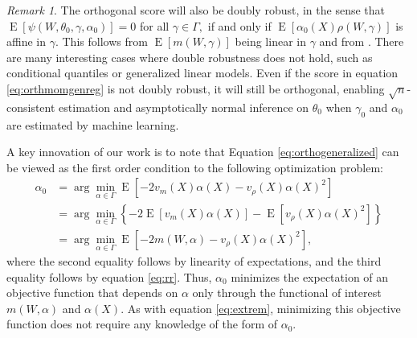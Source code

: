 \documentclass[aos]{imsart}
\numberwithin{equation}{section}
\theoremstyle{plain}
\theoremstyle{remark}
\newtheorem{remark}[theorem]{Remark}
\DeclareMathOperator{\E}{E}
\begin{document}

\begin{remark} 
The orthogonal score will also be doubly robust, in the sense that $\E[\psi(W,\theta_{0},\gamma,\alpha_{0})]=0$ for all $\gamma\in\Gamma,$ if and only if $\E[\alpha_{0}(X)\rho(W,\gamma)]$ is affine in $\gamma$. 
This follows from $\E[m(W,\gamma)]$ being linear in $\gamma$ and from \cite{chernozhukov2022locally}. 
There are many interesting cases where double robustness does not hold, such as conditional quantiles or generalized linear models. 
Even if the score in equation \eqref{eq:orthmomgenreg} is not doubly robust, it will still be orthogonal, enabling $\sqrt{n}$-consistent estimation and asymptotically normal inference on $\theta_{0}$ when $\gamma_{0}$ and $\alpha_{0}$ are estimated by machine learning.
\end{remark}

A key innovation of our work is to note that Equation \eqref{eq:orthogeneralized} can be viewed as the first order condition to the following optimization problem:
\begin{align}
\alpha_0 & = \arg\min_{\alpha\in\Gamma} \E[-2v_{m}(X)\alpha(X)-v_{\rho
}(X)\alpha(X)^{2}]\nonumber\\
& =\arg\min_{\alpha\in\Gamma}\left\{-2\E[v_{m}(X)\alpha(X)]-\E[v_{\rho}(X)\alpha(X)^{2}]\right\}\nonumber\\
& =\arg\min_{\alpha\in\Gamma} \E[-2m(W,\alpha)-v_{\rho}(X)\alpha
(X)^{2}],
\label{eq:wtrieszreg}
\end{align}
where the second equality follows by linearity of expectations, and the third equality follows by  equation \eqref{eq:rr}. 
Thus, $\alpha_{0}$ minimizes the expectation of an objective function that depends on $\alpha$ only through the functional of interest $m(W,\alpha)$ and $\alpha(X)$. 
As with equation \eqref{eq:extrem}, minimizing this objective function does not require any knowledge of the form of $\alpha_0$.
\end{document}

